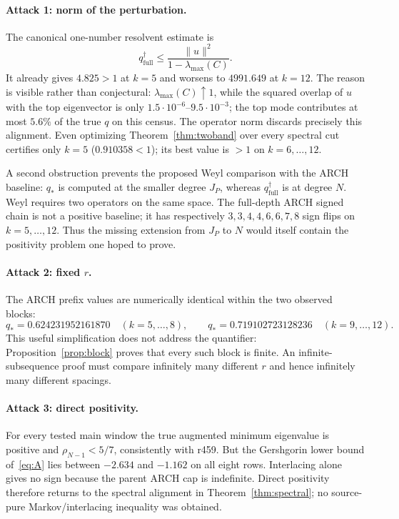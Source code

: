 \documentclass[11pt]{article}
\theoremstyle{remark}
\newcommand{\qfull}{q^{\dagger}_{\mathrm{full}}}
\newcommand{\qstar}{q_*}
\begin{document}
\paragraph{Attack 1: norm of the perturbation.}
The canonical one-number resolvent estimate is
\begin{equation}\label{eq:raw}
\qfull\le\frac{\|u\|^2}{1-\lambda_{\max}(C)}.
\end{equation}
It already gives $4.825>1$ at $k=5$ and worsens to
$4991.649$ at $k=12$.
The reason is visible rather than conjectural:
$\lambda_{\max}(C)\uparrow1$, while the squared overlap of $u$ with
the top eigenvector is only
$1.5\cdot10^{-6}$--$9.5\cdot10^{-3}$; the top mode contributes at
most $5.6\%$ of the true $q$ on this census.
The operator norm discards precisely this alignment.
Even optimizing Theorem~\ref{thm:twoband} over every spectral cut
certifies only $k=5$ ($0.910358<1$); its best value is $>1$ on
$k=6,\ldots,12$.

A second obstruction prevents the proposed Weyl comparison with the
ARCH baseline: $\qstar$ is computed at the smaller degree $J_P$,
whereas $\qfull$ is at degree $N$.  Weyl requires two operators on
the same space.  The full-depth ARCH signed chain is not a positive
baseline; it has respectively $3,3,4,4,6,6,7,8$ sign flips on
$k=5,\ldots,12$.  Thus the missing extension from $J_P$ to $N$
would itself contain the positivity problem one hoped to prove.

\paragraph{Attack 2: fixed $r$.}
The ARCH prefix values are numerically identical within the two
observed blocks:
\[
\qstar=0.624231952161870\quad(k=5,\ldots,8),\qquad
\qstar=0.719102723128236\quad(k=9,\ldots,12).
\]
This useful simplification does not address the quantifier:
Proposition~\ref{prop:block} proves that every such block is finite.
An infinite-subsequence proof must compare infinitely many different
$r$ and hence infinitely many different spacings.

\paragraph{Attack 3: direct positivity.}
For every tested main window the true augmented minimum eigenvalue is
positive and $\rho_{N-1}<5/7$, consistently with r459.
But the Gershgorin lower bound of~\eqref{eq:A} lies between
$-2.634$ and $-1.162$ on all eight rows.
Interlacing alone gives no sign because the parent ARCH cap is
indefinite.  Direct positivity therefore returns to the spectral
alignment in Theorem~\ref{thm:spectral}; no source-pure
Markov/interlacing inequality was obtained.
\end{document}
